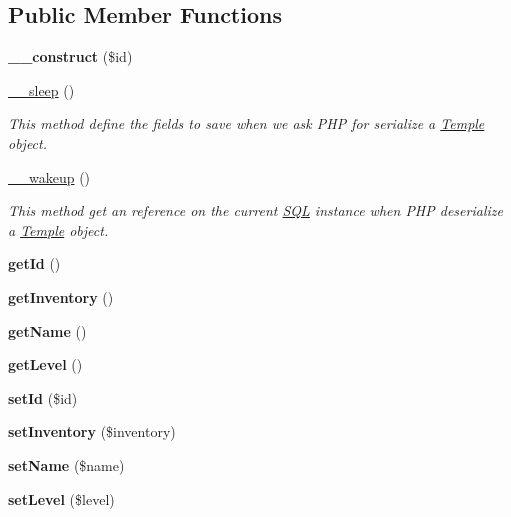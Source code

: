 \subsection*{Public Member Functions}
\begin{DoxyCompactItemize}
\item 
\mbox{\label{classTemple_a4ab81135c56914a761d573a979d3d02b}} 
{\bfseries \+\_\+\+\_\+construct} (\$id)
\item 
\mbox{\hyperlink{classTemple_a08700fe7671bb090ddb042a65a452609}{\+\_\+\+\_\+sleep}} ()
\begin{DoxyCompactList}\small\item\em This method define the fields to save when we ask P\+HP for serialize a \mbox{\hyperlink{classTemple}{Temple}} object. \end{DoxyCompactList}\item 
\mbox{\label{classTemple_a7412906ca0259c9c93fa8fd39f776a2a}} 
\mbox{\hyperlink{classTemple_a7412906ca0259c9c93fa8fd39f776a2a}{\+\_\+\+\_\+wakeup}} ()
\begin{DoxyCompactList}\small\item\em This method get an reference on the current \mbox{\hyperlink{classSQL}{S\+QL}} instance when P\+HP deserialize a \mbox{\hyperlink{classTemple}{Temple}} object. \end{DoxyCompactList}\item 
\mbox{\label{classTemple_ae6cd1081e13a58adb55d7f2825ad1768}} 
{\bfseries get\+Id} ()
\item 
\mbox{\label{classTemple_a91b5b70bc92fe67da3f5f248411fa4a3}} 
{\bfseries get\+Inventory} ()
\item 
\mbox{\label{classTemple_a5f8a7e744c00d4e04e099dff3fd5db83}} 
{\bfseries get\+Name} ()
\item 
\mbox{\label{classTemple_a7f7c7d1add89ba9ad3900e8690d8f3a7}} 
{\bfseries get\+Level} ()
\item 
\mbox{\label{classTemple_a7a97675febdc1f8802437fdb40b1e0fd}} 
{\bfseries set\+Id} (\$id)
\item 
\mbox{\label{classTemple_aefa4371cdcd6f1bcbe7a342823c0cd79}} 
{\bfseries set\+Inventory} (\$inventory)
\item 
\mbox{\label{classTemple_a381f5fb042fe423b7a920c32fa0655f4}} 
{\bfseries set\+Name} (\$name)
\item 
\mbox{\label{classTemple_a11af9c5c45b7b3155bac6d48eb950e0c}} 
{\bfseries set\+Level} (\$level)
\end{DoxyCompactItemize}
